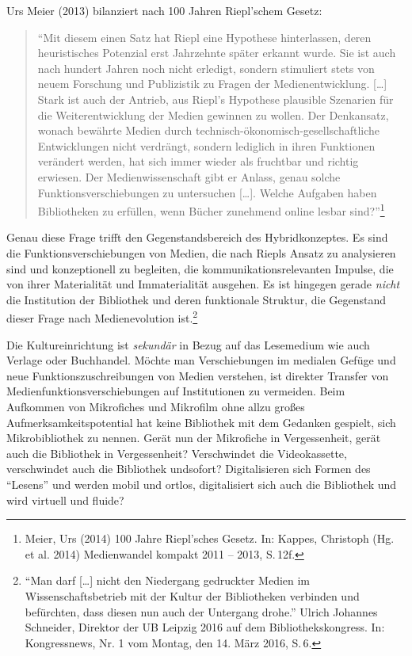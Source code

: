 \documentclass[a4paper,
fontsize=11pt,
oneside,
numbers=noperiodatend,
parskip=half-,
bibliography=totoc,
final
]{scrartcl}
\begin{document}
Urs Meier (2013) bilanziert nach 100 Jahren Riepl'schem Gesetz:

\begin{quote}
\enquote{Mit diesem einen Satz hat Riepl eine Hypothese hinterlassen,
deren heuristisches Potenzial erst Jahrzehnte später erkannt wurde. Sie
ist auch nach hundert Jahren noch nicht erledigt, sondern stimuliert
stets von neuem Forschung und Publizistik zu Fragen der
Medienentwicklung. {[}\ldots{}{]} Stark ist auch der Antrieb, aus
Riepl's Hypothese plausible Szenarien für die Weiterentwicklung der
Medien gewinnen zu wollen. Der Denkansatz, wonach bewährte Medien durch
technisch-ökonomisch-gesellschaftliche Entwicklungen nicht verdrängt,
sondern lediglich in ihren Funktionen verändert werden, hat sich immer
wieder als fruchtbar und richtig erwiesen. Der Medienwissenschaft gibt
er Anlass, genau solche Funktionsverschiebungen zu untersuchen
{[}\ldots{}{]}. Welche Aufgaben haben Bibliotheken zu erfüllen, wenn
Bücher zunehmend online lesbar sind?}\footnote{Meier, Urs (2014) 100
  Jahre Riepl'sches Gesetz. In: Kappes, Christoph (Hg. et al. 2014)
  Medienwandel kompakt 2011 -- 2013, S.\,12f.}
\end{quote}

Genau diese Frage trifft den Gegenstandsbereich des Hybridkonzeptes. Es
sind die Funktionsverschiebungen von Medien, die nach Riepls Ansatz zu
analysieren sind und konzeptionell zu begleiten, die
kommunikationsrelevanten Impulse, die von ihrer Materialität und
Immaterialität ausgehen. Es ist hingegen gerade \emph{nicht} die
Institution der Bibliothek und deren funktionale Struktur, die
Gegenstand dieser Frage nach Medienevolution ist.\footnote{\enquote{Man
  darf {[}\ldots{}{]} nicht den Niedergang gedruckter Medien im
  Wissenschaftsbetrieb mit der Kultur der Bibliotheken verbinden und
  befürchten, dass diesen nun auch der Untergang drohe.} Ulrich Johannes
  Schneider, Direktor der UB Leipzig 2016 auf dem Bibliothekskongress.
  In: Kongressnews, Nr. 1 vom Montag, den 14. März 2016, S.\,6.}

Die Kultureinrichtung ist \emph{sekundär} in Bezug auf das Lesemedium
wie auch Verlage oder Buchhandel. Möchte man Verschiebungen im medialen
Gefüge und neue Funktionszuschreibungen von Medien verstehen, ist
direkter Transfer von Medienfunktionsverschiebungen auf Institutionen zu
vermeiden. Beim Aufkommen von Mikrofiches und Mikrofilm ohne allzu
großes Aufmerksamkeitspotential hat keine Bibliothek mit dem Gedanken
gespielt, sich Mikrobibliothek zu nennen. Gerät nun der Mikrofiche in
Vergessenheit, gerät auch die Bibliothek in Vergessenheit? Verschwindet
die Videokassette, verschwindet auch die Bibliothek undsofort?
Digitalisieren sich Formen des \enquote{Lesens} und werden mobil und
ortlos, digitalisiert sich auch die Bibliothek und wird virtuell und
fluide?
\end{document}
